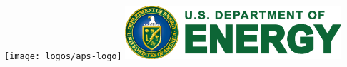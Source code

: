 \documentclass[portrait,final,paperwidth=120cm, paperheight=240cm,  fontscale=0.277]{baposter}
\begin{document}
\begin{poster}
{\vspace{1em}
\begin{centering}
	\texttt{[image: logos/aps-logo]}\hspace{5mm}
	\includegraphics[width=0.6\textwidth]{logos/DOE_logo_color_cmyk}
	
\end{centering}




}


\end{poster}%
%
\end{document}
